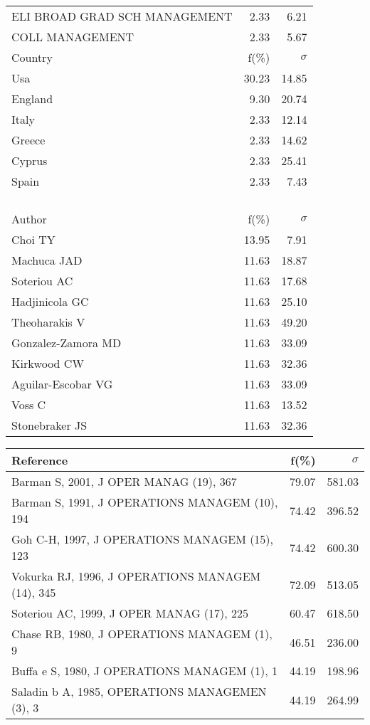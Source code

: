 \documentclass[a4paper,11pt]{report}
\begin{document}
\begin{landscape}
\begin{table}[!ht]
{\begin{tabular}{|l r r|}
ELI BROAD GRAD SCH MANAGEMENT & 2.33 & 6.21\\
COLL MANAGEMENT & 2.33 & 5.67\\
\hline
\hline
Country & f(\%) & $\sigma$\\
\hline
Usa & 30.23 & 14.85\\
England & 9.30 & 20.74\\
Italy & 2.33 & 12.14\\
Greece & 2.33 & 14.62\\
Cyprus & 2.33 & 25.41\\
Spain & 2.33 & 7.43\\
 &  & \\
 &  & \\
 &  & \\
 &  & \\
\hline
\hline
Author & f(\%) & $\sigma$\\
\hline
Choi TY & 13.95 & 7.91\\
Machuca JAD & 11.63 & 18.87\\
Soteriou AC & 11.63 & 17.68\\
Hadjinicola GC & 11.63 & 25.10\\
Theoharakis V & 11.63 & 49.20\\
Gonzalez-Zamora MD & 11.63 & 33.09\\
Kirkwood CW & 11.63 & 32.36\\
Aguilar-Escobar VG & 11.63 & 33.09\\
Voss C & 11.63 & 13.52\\
Stonebraker JS & 11.63 & 32.36\\
\hline
\end{tabular}
}
{\scriptsize\begin{tabular}{|l r r|}
\hline
Reference & f(\%) & $\sigma$\\
\hline
Barman S, 2001, J OPER MANAG (19), 367 & 79.07 & 581.03\\
Barman S, 1991, J OPERATIONS MANAGEM (10), 194 & 74.42 & 396.52\\
Goh C-H, 1997, J OPERATIONS MANAGEM (15), 123 & 74.42 & 600.30\\
Vokurka RJ, 1996, J OPERATIONS MANAGEM (14), 345 & 72.09 & 513.05\\
Soteriou AC, 1999, J OPER MANAG (17), 225 & 60.47 & 618.50\\
Chase RB, 1980, J OPERATIONS MANAGEM (1), 9 & 46.51 & 236.00\\
Buffa e S, 1980, J OPERATIONS MANAGEM (1), 1 & 44.19 & 198.96\\
Saladin b A, 1985, OPERATIONS MANAGEMEN (3), 3 & 44.19 & 264.99\\

\end{tabular}}
\end{table}
\end{landscape}
\end{document}

